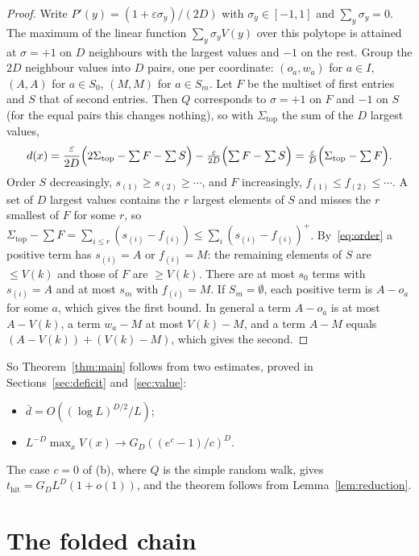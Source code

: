 \documentclass[11pt]{amsart}
\theoremstyle{remark}
\newcommand{\eps}{\varepsilon}
\newcommand{\thit}{t_{\mathrm{hit}}}
\begin{document}
\begin{proof}
Write $P'(y)=(1+\eps\sigma_y)/(2D)$ with $\sigma_y\in[-1,1]$ and $\sum_y\sigma_y=0$. The maximum of the linear function
$\sum_y\sigma_yV(y)$ over this polytope is attained at $\sigma=+1$ on $D$ neighbours with the largest values and $-1$ on
the rest. Group the $2D$ neighbour values into $D$ pairs, one per coordinate: $(o_a,w_a)$ for $a\in I$, $(A,A)$ for
$a\in S_0$, $(M,M)$ for $a\in S_m$. Let $F$ be the multiset of first entries and $S$ that of second entries. Then $Q$
corresponds to $\sigma=+1$ on $F$ and $-1$ on $S$ (for the equal pairs this changes nothing), so with
$\Sigma_{\mathrm{top}}$ the sum of the $D$ largest values,
\[
d(x)=\frac{\eps}{2D}\Bigl(2\Sigma_{\mathrm{top}}-\textstyle\sum F-\sum S\Bigr)-\frac{\eps}{2D}\Bigl(\sum F-\sum S\Bigr)
=\frac{\eps}{D}\Bigl(\Sigma_{\mathrm{top}}-\textstyle\sum F\Bigr).
\]
Order $S$ decreasingly, $s_{(1)}\ge s_{(2)}\ge\cdots$, and $F$ increasingly, $f_{(1)}\le f_{(2)}\le\cdots$. A set of
$D$ largest values contains the $r$ largest elements of $S$ and misses the $r$ smallest of $F$ for some $r$, so
$\Sigma_{\mathrm{top}}-\sum F=\sum_{i\le r}(s_{(i)}-f_{(i)})\le\sum_i(s_{(i)}-f_{(i)})^+$. By~\eqref{eq:order} a
positive term has $s_{(i)}=A$ or $f_{(i)}=M$: the remaining elements of $S$ are $\le V(k)$ and those of $F$ are
$\ge V(k)$. There are at most $s_0$ terms with $s_{(i)}=A$ and at most $s_m$ with $f_{(i)}=M$. If $S_m=\emptyset$, each
positive term is $A-o_a$ for some $a$, which gives the first bound. In general a term $A-o_a$ is at most $A-V(k)$, a
term $w_a-M$ at most $V(k)-M$, and a term $A-M$ equals $(A-V(k))+(V(k)-M)$, which gives the second.
\end{proof}

So Theorem~\ref{thm:main} follows from two estimates, proved in Sections~\ref{sec:deficit} and~\ref{sec:value}:
\begin{itemize}
\item[(a)] $\bar d=O((\log L)^{D/2}/L)$;
\item[(b)] $L^{-D}\max_xV(x)\to G_D((e^c-1)/c)^D$.
\end{itemize}
The case $c=0$ of (b), where $Q$ is the simple random walk, gives $\thit=G_DL^D(1+o(1))$, and the theorem follows from
Lemma~\ref{lem:reduction}.

\section{The folded chain}\label{sec:folded}
\end{document}
